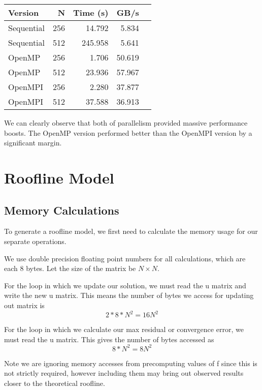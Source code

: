 \documentclass[11pt]{article}
\begin{document}
\begin{table}
    \centering
    \begin{tabular}{lrrrr}
        \toprule
        Version & N & Time (s) & GB/s \\
        \midrule
        Sequential & 256 & 14.792 & 5.834 \\
        Sequential & 512 & 245.958 & 5.641 \\
        OpenMP & 256 & 1.706 & 50.619 \\
        OpenMP & 512 & 23.936 & 57.967 \\
        OpenMPI & 256 & 2.280 & 37.877 \\
        OpenMPI & 512 & 37.588 & 36.913 \\
        \bottomrule
    \end{tabular}
\end{table}

We can clearly observe that both of parallelism provided massive performance boosts. The OpenMP version performed better than the OpenMPI version by a significant margin. 

\section*{Roofline Model}

\subsection*{Memory Calculations}

To generate a roofline model, we first need to calculate the memory usage for our separate operations. 

We use double precision floating point numbers for all calculations, which are each 8 bytes. Let the size of the matrix be $N \times N$.

For the loop in which we update our solution, we must read the u matrix and write the new u matrix. This means the number of bytes we access for updating out matrix is
\[
    2 * 8 * N^2 = 16N^2
\]

For the loop in which we calculate our max residual or convergence error, we must read the u matrix. This gives the number of bytes accessed as
\[
    8 * N^2 = 8N^2
\]

Note we are ignoring memory accesses from precomputing values of f since this is not strictly required, however including them may bring out observed results closer to the theoretical roofline.
\end{document}
